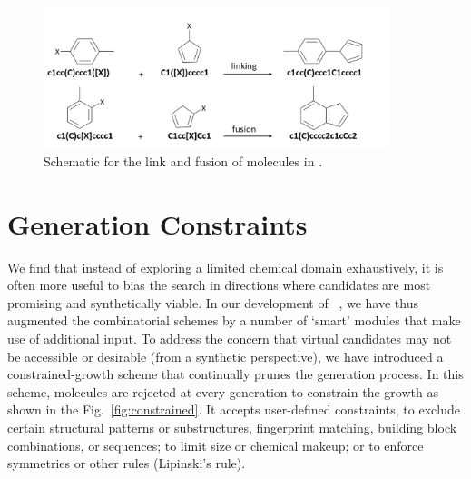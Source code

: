 \begin{figure}[htbp] 
	\centering
	\includegraphics[width=0.9\textwidth]{Chapter-4/Figures/link+fusion.jpg}
	\caption{Schematic for the link and fusion of molecules in \chemlg.} 
	\label{fig:link+fusion} 
\end{figure}  

\section{Generation Constraints}

We find that instead of exploring a limited chemical domain exhaustively, it is often more useful to bias the search in directions where candidates are most promising and synthetically viable. In our development of \chemlg\ , we have thus augmented the combinatorial schemes by a number of `smart' modules that make use of additional input. To address the concern that virtual candidates may not be accessible or desirable (\eg  from a synthetic perspective), we have introduced a constrained-growth scheme that continually prunes the generation process. In this scheme, molecules are rejected at every generation to constrain the growth as shown in the Fig.\ \ref{fig:constrained}. It accepts user-defined constraints, \eg  to exclude certain structural patterns or substructures, fingerprint matching, building block combinations, or sequences; to limit size or chemical makeup; or to enforce symmetries or other rules (\eg  Lipinski's rule).


